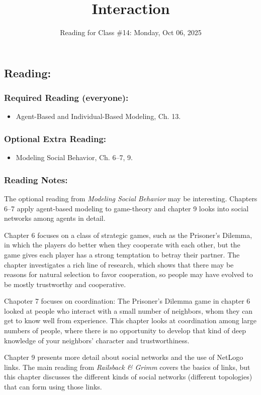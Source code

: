 \documentclass[
]{article}
\title{Interaction}
\author{}
\date{\vspace{-2.5em}Reading for Class \#14: Monday, Oct 06, 2025}
\providecommand{\tightlist}{%
  \setlength{\itemsep}{0pt}\setlength{\parskip}{0pt}}
\begin{document}
\maketitle

{
\setcounter{tocdepth}{2}
\tableofcontents
}
\subsection{Reading:}\label{reading}

\subsubsection{Required Reading
(everyone):}\label{required-reading-everyone}

\begin{itemize}
\tightlist
\item
  Agent-Based and Individual-Based Modeling, Ch. 13.
\end{itemize}

\subsubsection{Optional Extra Reading:}\label{optional-extra-reading}

\begin{itemize}
\tightlist
\item
  Modeling Social Behavior, Ch. 6--7, 9.
\end{itemize}

\subsubsection{Reading Notes:}\label{reading-notes}

The optional reading from \emph{Modeling Social Behavior} may be
interesting. Chapters 6--7 apply agent-based modeling to game-theory and
chapter 9 looks into social networks among agents in detail.

Chapter 6 focuses on a class of strategic games, such as the Prisoner's
Dilemma, in which the players do better when they cooperate with each
other, but the game gives each player has a strong temptation to betray
their partner. The chapter investigates a rich line of research, which
shows that there may be reasons for natural selection to favor
cooperation, so people may have evolved to be mostly trustworthy and
cooperative.

Chapoter 7 focuses on coordination: The Prisoner's Dilemma game in
chapter 6 looked at people who interact with a small number of
neighbors, whom they can get to know well from experience. This chapter
looks at coordination among large numbers of people, where there is no
opportunity to develop that kind of deep knowledge of your neighbors'
character and trustworthiness.

Chapter 9 presents more detail about social networks and the use of
NetLogo links. The main reading from \emph{Railsback \& Grimm} covers
the basics of links, but this chapter discusses the different kinds of
social networks (different topologies) that can form using those links.
\end{document}
